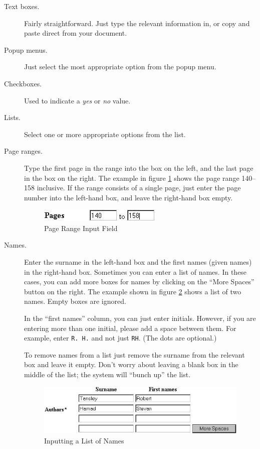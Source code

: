 \begin{description}

\item[Text boxes.] Fairly straightforward. Just type the relevant information in, or copy and paste direct from your document.

\item[Popup menus.] Just select the most appropriate option from the popup menu.

\item[Checkboxes.] Used to indicate a \emph{yes} or \emph{no} value.

\item[Lists.] Select one or more appropriate options from the list.

\item[Page ranges.] Type the first page in the range into the box on the left, and the last page in the box on the right. The example in figure \ref{pagerange} shows the page range 140--158 inclusive. If the range consists of a single page, just enter the page number into the left-hand box, and leave the right-hand box empty.

\begin{figure}
\centerline{\includegraphics[width=2.3in]{images/pagerange}}
\caption{\label{pagerange} Page Range Input Field}
\end{figure}

\item[Names.] Enter the surname in the left-hand box and the first names (given names) in the right-hand box. Sometimes you can enter a list of names. In these cases, you can add more boxes for names by clicking on the ``More Spaces'' button on the right. The example shown in figure \ref{names} shows a list of two names. Empty boxes are ignored.

In the ``first names'' column, you can just enter initials. However, if you are entering more than one initial, please add a space between them. For example, enter {\tt R. H.} and not just {\tt RH}. (The dots are optional.)

To remove names from a list just remove the surname from the relevant box and leave it empty. Don't worry about leaving a blank box in the middle of the list; the system will ``bunch up'' the list.

\begin{figure}
\centerline{\includegraphics[width=4.8in]{images/names}}
\caption{\label{names} Inputting a List of Names}
\end{figure}

\end{description}

